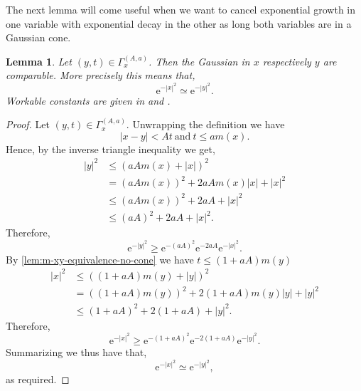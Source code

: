 \documentclass[a4paper,oneside,10pt]{amsproc}
\theoremstyle{plain}
\newtheorem{lemma}{Lemma}
\theoremstyle{remark}
\theoremstyle{definition}
\renewcommand{\leq}{\leqslant}
\renewcommand{\leq}{\leqslant}
\renewcommand{\geq}{\geqslant}
\newcommand{\e}{\mathrm{e}} %
\renewcommand{\leq}{\leqslant} %
\renewcommand{\geq}{\geqslant} %
\begin{document}
The next lemma will come useful when we want to cancel exponential
growth in one variable with exponential decay in the other as long
both variables are in a Gaussian cone.
\begin{lemma}\label{lem:Cone-Gaussians-comparable}
  Let $(y, t) \in \Gamma_x^{(A, a)}$. Then the Gaussian in $x$
  respectively $y$ are comparable. More precisely this means that,
  \begin{equation*}
    \e^{-|x|^2} \simeq \e^{-|y|^2}.
  \end{equation*}
  Workable constants are given in \label{eq:Cone-Gaussians-comparable-1}
  and \label{eq:Cone-Gaussians-comparable-2}.
\end{lemma}

\begin{proof}
  Let $(y, t) \in \Gamma_x^{(A, a)}$. Unwrapping the definition we
  have
  \begin{equation*}
    |x - y| < A t \:\text{and}\: t \leq a m(x).
  \end{equation*}
  Hence, by the inverse triangle inequality we get,
  \begin{align*}
    |y|^2 &\leq (aA m(x) + |x|)^2\\
    &= (aA m(x))^2 + 2 a A m(x) |x| + |x|^2\\
    &\leq (aA m(x))^2 + 2 a A + |x|^2\\
    &\leq (aA)^2 + 2 a A + |x|^2.
  \end{align*}
  Therefore,
  \begin{equation}
    \label{eq:Cone-Gaussians-comparable-1}
    \e^{-|y|^2} \geq \e^{-(aA)^2} \e^{-2 aA} \e^{-|x|^2}.
  \end{equation}
  By \autoref{lem:m-xy-equivalence-no-cone} we have $t \leq (1 + aA)
  m(y)$
  \begin{align*}
    |x|^2 &\leq ((1 + aA) m(y) + |y|)^2\\
    &= ((1 + aA) m(y))^2 + 2(1 + aA)m(y)|y| + |y|^2\\
    &\leq (1 + aA)^2 + 2(1 + aA) + |y|^2.
  \end{align*}
  Therefore,
  \begin{equation}
    \label{eq:Cone-Gaussians-comparable-2}
    \e^{-|x|^2} \geq \e^{-(1 + aA)^2} \e^{-2(1 + aA)} \e^{-|y|^2}.
  \end{equation}
  Summarizing we thus have that,
  \begin{equation*}
    \e^{-|x|^2} \simeq \e^{-|y|^2},
  \end{equation*}
  as required.
\end{proof}
\end{document}
